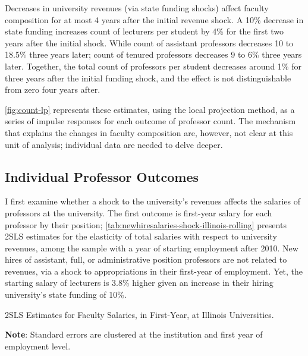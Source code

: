 Decreases in university revenues (via state funding shocks) affect faculty composition for at most 4 years after the initial revenue shock.
A 10\% decrease in state funding increases count of lecturers per student by 4\% for the first two years after the initial shock.
While count of assistant professors decreases 10 to 18.5\% three years later;
count of tenured professors decreases 9 to 6\% three years later.
Together, the total count of professors per student decreases around 1\% for three years after the initial funding shock, and the effect is not distinguishable from zero four years after.

\autoref{fig:count-lp} represents these estimates, using the local projection method, as a series of impulse responses for each outcome of professor count.
The mechanism that explains the changes in faculty composition are, however, not clear at this unit of analysis; individual data are needed to delve deeper.

\subsection{Individual Professor Outcomes}

I first examine whether a shock to the university's revenues affects the salaries of professors at the university.
The first outcome is first-year salary for each professor by their position;
\autoref{tab:newhiresalaries-shock-illinois-rolling} presents 2SLS estimates for the elasticity of total salaries with respect to university revenues, among the sample with a year of starting employment after 2010.
New hires of assistant, full, or administrative position professors are not related to revenues, via a shock to appropriations in their first-year of employment.
Yet, the starting salary of lecturers is 3.8\% higher given an increase in their hiring university's state funding of 10\%.

\begin{table}[h!]
    \singlespacing
    \centering
    \caption{2SLS Estimates for Faculty Salaries, in First-Year, at Illinois Universities.}
    \makebox[\textwidth][c]{}
    \begin{flushleft}
        \footnotesize
        \textbf{Note}: Standard errors are clustered at the institution and first year of employment level. 
    \end{flushleft}
    \label{tab:newhiresalaries-shock-illinois-rolling}
\end{table}

